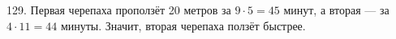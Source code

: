 129. Первая черепаха проползёт 20 метров за $9\cdot5=45$ минут, а вторая --- за $4\cdot11=44$ минуты. Значит, вторая черепаха ползёт быстрее.\\
